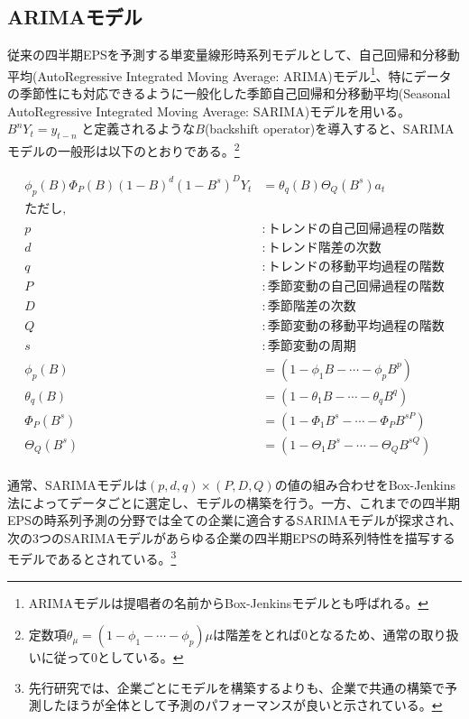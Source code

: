\documentclass[a4paper, 12pt]{jsreport}
\begin{document}
\subsection{ARIMAモデル}

従来の四半期EPSを予測する単変量線形時系列モデルとして、自己回帰和分移動平均(AutoRegressive Integrated Moving Average: ARIMA)モデル\citep{box2015time}\footnote{ARIMAモデルは提唱者の名前からBox-Jenkinsモデルとも呼ばれる。}、特にデータの季節性にも対応できるように一般化した季節自己回帰和分移動平均(Seasonal AutoRegressive Integrated Moving Average: SARIMA)モデルを用いる。$B^nY_t = y_{t-n}$ と定義されるような$B$(backshift operator)を導入すると、SARIMAモデルの一般形は以下のとおりである。\footnote{定数項$\theta_{\mu}=(1-\phi_1-\cdots-\phi_p)\mu$は階差をとれば0となるため、通常の取り扱いに従って0としている。}

\begin{equation}
  \begin{split}
    \phi_p(B)\Phi_{P}(B)(1-B)^d(1-B^s)^DY_t &= \theta_q(B)\Theta_Q(B^s)a_t \\
    ただし, \\
    p &: トレンドの自己回帰過程の階数 \\
    d &: トレンド階差の次数 \\
    q &: トレンドの移動平均過程の階数 \\
    P &: 季節変動の自己回帰過程の階数 \\
    D &: 季節階差の次数 \\
    Q &: 季節変動の移動平均過程の階数 \\
    s &: 季節変動の周期 \\
    \phi_p(B) &= (1 - \phi_1B - \cdots - \phi_pB^p) \\
    \theta_q(B) &= (1 - \theta_1B - \cdots - \theta_qB^q) \\
    \Phi_P(B^s) &= (1 - \Phi_1B^s - \cdots - \Phi_PB^{sP}) \\
    \Theta_Q(B^s) &= (1 - \Theta_1B^s - \cdots - \Theta_QB^{sQ}) \\
  \end{split}
\end{equation}

通常、SARIMAモデルは$(p, d, q) \times (P, D, Q)$の値の組み合わせをBox-Jenkins法によってデータごとに選定し、モデルの構築を行う。一方、これまでの四半期EPSの時系列予測の分野では全ての企業に適合するSARIMAモデルが探求され、次の3つのSARIMAモデル\citep*{foster1977quarterly, griffin1977time, brown1979univariate}があらゆる企業の四半期EPSの時系列特性を描写するモデルであるとされている。\footnote{先行研究では、企業ごとにモデルを構築するよりも、企業で共通の構築で予測したほうが全体として予測のパフォーマンスが良いと示されている。}
\end{document}
